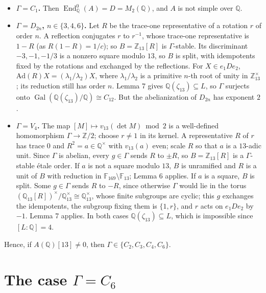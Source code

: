 \documentclass[11pt]{article}
\newcommand{\Q}{\mathbb Q}
\newcommand{\Z}{\mathbb Z}
\newcommand{\F}{\mathbb F}
\DeclareMathOperator{\End}{End}
\DeclareMathOperator{\Gal}{Gal}
\begin{document}
\begin{itemize}
\item \textbf{\(\Gamma=C_1\).} Then \(\End^0_{\Q}(A)=D=M_2(\Q)\), and \(A\) is not simple over \(\Q\).
\item \textbf{\(\Gamma=D_{2n}\), \(n\in\{3,4,6\}\).} Let \(R\) be the trace-one representative of a rotation
          \(r\) of order \(n\). A reflection conjugates \(r\) to \(r^{-1}\), whose trace-one representative is
          \(1-R\) (as \(R(1-R)=1/c\)); so \(B=\Z_{13}[R]\) is \(\Gamma\)-stable. Its discriminant
          \(-3,-1,-1/3\) is a nonzero square modulo \(13\), so \(B\) is split, with idempotents fixed by the
          rotations and exchanged by the reflections. For \(X\in e_1De_2\), \(\mathrm{Ad}(R)X=(\lambda_1/\lambda_2)X\),
          where \(\lambda_1/\lambda_2\) is a primitive \(n\)-th root of unity in \(\Z_{13}^\times\); its reduction
          still has order \(n\). Lemma 7 gives \(\Q(\zeta_{13})\subseteq L\), so \(\Gamma\) surjects onto
          \(\Gal(\Q(\zeta_{13})/\Q)\cong C_{12}\). But the abelianization of \(D_{2n}\) has exponent \(2\).
\item \textbf{\(\Gamma=V_4\).} The map \([M]\mapsto v_{13}(\det M)\bmod2\) is a well-defined homomorphism
          \(\Gamma\to\Z/2\); choose \(r\neq1\) in its kernel. A representative \(R\) of \(r\) has trace \(0\)
          and \(R^2=a\in\Q^\times\) with \(v_{13}(a)\) even; scale \(R\) so that \(a\) is a \(13\)-adic unit.
          Since \(\Gamma\) is abelian, every \(g\in\Gamma\) sends \(R\) to \(\pm R\), so \(B=\Z_{13}[R]\) is a
          \(\Gamma\)-stable étale order. If \(a\) is not a square modulo \(13\), \(B\) is unramified and \(R\) is a
          unit of \(B\) with reduction in \(\F_{169}\setminus\F_{13}\); Lemma 6 applies. If \(a\) is a square,
          \(B\) is split. Some \(g\in\Gamma\) sends \(R\) to \(-R\), since otherwise \(\Gamma\) would lie in the
          torus \((\Q_{13}[R])^\times/\Q_{13}^\times\cong\Q_{13}^\times\), whose finite subgroups are cyclic; this
          \(g\) exchanges the idempotents, the subgroup fixing them is \(\{1,r\}\), and \(r\) acts on
          \(e_1De_2\) by \(-1\). Lemma 7 applies. In both cases \(\Q(\zeta_{13})\subseteq L\), which is
          impossible since \([L:\Q]=4\).
\end{itemize}

Hence, if \(A(\Q)[13]\neq0\), then \(\Gamma\in\{C_2,C_3,C_4,C_6\}\).

\section{The case \(\Gamma=C_6\)}\label{c6}
\end{document}
